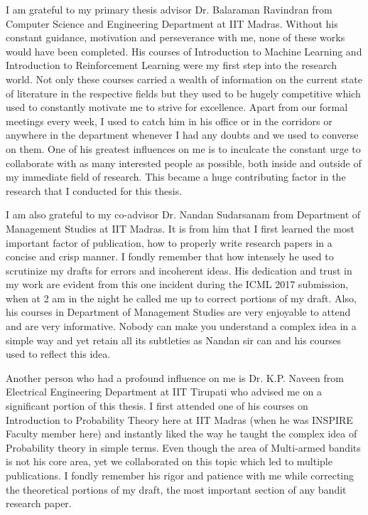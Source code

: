I am grateful to my primary thesis advisor Dr. Balaraman Ravindran from Computer Science and Engineering Department at IIT Madras. Without his constant guidance, motivation and perseverance with me, none of these works would have been completed. His courses of Introduction to Machine Learning and Introduction to Reinforcement Learning were my first step into the research world. Not only these courses carried a wealth of information on the current state of literature in the respective fields but they used to be hugely competitive which used to constantly motivate me to strive for excellence. Apart from our formal meetings every week, I used to catch him in his office or in the corridors or anywhere in the department whenever I had any doubts and we used to converse on them. One of his greatest influences on me is to inculcate the constant urge to collaborate with as many interested people as possible, both inside and outside of my immediate field of research. This became a huge contributing factor in the research that I conducted for this thesis.

I am also grateful to my co-advisor Dr. Nandan Sudarsanam from Department of Management Studies at IIT Madras. It is from him that I first learned the most important factor of publication, how to properly write research papers in a concise and crisp manner. I fondly remember that how intensely he used to scrutinize my drafts for errors and incoherent ideas. His dedication and trust in my work are evident from this one incident during the ICML 2017 submission, when at 2 am in the night he called me up to correct portions of my draft. Also, his courses in Department of Management Studies are very enjoyable to attend and are very informative. Nobody can make you understand a complex idea in a simple way and yet retain all its subtleties as Nandan sir can and his courses used to reflect this idea.

Another person who had a profound influence on me is Dr. K.P. Naveen from Electrical Engineering Department at IIT Tirupati who advised me on a significant portion of this thesis. I first attended one of his courses on Introduction to Probability Theory here at IIT Madras (when he was INSPIRE Faculty member here) and instantly liked the way he taught the complex idea of Probability theory in simple terms. Even though the area of Multi-armed bandits is not his core area, yet we collaborated on this topic which led to multiple publications. I fondly remember his rigor and patience with me while correcting the theoretical portions of my draft, the most important section of any bandit research paper.

